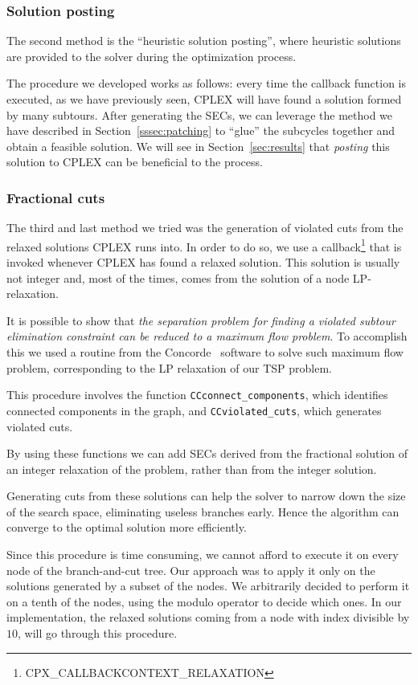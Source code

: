 \documentclass{article}
\begin{document}
\subsubsection{Solution posting}

The second method is the ``heuristic solution posting'', where heuristic solutions are provided to the solver during the optimization process.

The procedure we developed works as follows: every time the callback function
is executed, as we have previously seen, CPLEX will have found a solution
formed by many subtours. After generating the SECs, we can leverage the
method we have described in Section~\ref{sssec:patching} to ``glue'' the subcycles
together and obtain a feasible solution. We will see in
Section~\ref{sec:results} that \textit{posting} this solution to CPLEX can
be beneficial to the process.


\subsubsection{Fractional cuts}
The third and last method we tried was the generation of violated cuts from the relaxed
solutions CPLEX runs into.
In order to do so, we use a callback\footnote{CPX\_CALLBACKCONTEXT\_RELAXATION} that is
invoked whenever CPLEX has found a relaxed solution.
This solution is usually not integer and, most of the times, comes from the solution
of a node LP-relaxation.

It is possible to show that \textit{the separation problem for finding a violated subtour elimination
constraint can be reduced to a maximum flow problem}.
To accomplish this we used a routine from the Concorde~\cite{applegate1998solution} software to solve such maximum flow problem,
corresponding to the LP relaxation of our TSP problem.

This procedure involves the function \verb|CCconnect_components|,
which identifies connected components in the graph, and \verb|CCviolated_cuts|, which generates violated cuts.

By using these functions we can add SECs derived from the fractional solution of an integer relaxation
of the problem, rather than from the integer solution.

Generating cuts from these solutions can help the solver to narrow down the size of the search space, eliminating
useless branches early. Hence the algorithm can converge to the optimal solution more efficiently.

Since this procedure is time consuming, we cannot afford to execute it on every
node of the branch-and-cut tree. Our approach was to apply it only on the
solutions generated by a subset of the nodes. We arbitrarily decided to perform
it on a tenth of the nodes, using the modulo operator to decide which ones. In
our implementation, the relaxed solutions coming from a node with index divisible by $10$,
will go through this procedure.
\end{document}

